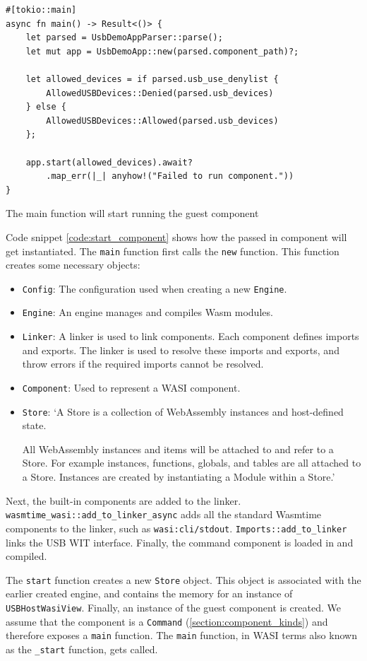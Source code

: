 \begin{code}
\begin{verbatim}
#[tokio::main]
async fn main() -> Result<()> {
	let parsed = UsbDemoAppParser::parse();
	let mut app = UsbDemoApp::new(parsed.component_path)?;

	let allowed_devices = if parsed.usb_use_denylist {
		AllowedUSBDevices::Denied(parsed.usb_devices)
	} else {
		AllowedUSBDevices::Allowed(parsed.usb_devices)
	};

	app.start(allowed_devices).await?
		.map_err(|_| anyhow!("Failed to run component."))
}
\end{verbatim}
\caption{The main function will start running the guest component}
\label{code:main}
\end{code}

Code snippet \ref{code:start_component} shows how the passed in component will get instantiated. The \texttt{main} function first calls the \texttt{new} function. This function creates some necessary objects: 
\begin{itemize}
\item \texttt{Config}: The configuration used when creating a new \texttt{Engine}.
\item \texttt{Engine}: An engine manages and compiles Wasm modules.
\item \texttt{Linker}: A linker is used to link components. Each component defines imports and exports. The linker is used to resolve these imports and exports, and throw errors if the required imports cannot be resolved.
\item \texttt{Component}: Used to represent a \acrshort{WASI} component.
\item \texttt{Store}: `A Store is a collection of WebAssembly instances and host-defined state.

All WebAssembly instances and items will be attached to and refer to a Store. For example instances, functions, globals, and tables are all attached to a Store. Instances are created by instantiating a Module within a Store.' \cite{wasmtime_store}
\end{itemize}

Next, the built-in components are added to the linker. \texttt{wasmtime\_wasi::add\_to\_linker\_async} adds all the standard Wasmtime components to the linker, such as \texttt{wasi:cli/stdout}. \texttt{Imports::add\_to\_linker} links the USB \acrshort{WIT} interface. Finally, the command component is loaded in and compiled.

The \texttt{start} function creates a new \texttt{Store} object. This object is associated with the earlier created engine, and contains the memory for an instance of \texttt{USBHostWasiView}. Finally, an instance of the guest component is created. We assume that the component is a \texttt{Command} (\ref{section:component_kinds}) and therefore exposes a \texttt{main} function. The \texttt{main} function, in \acrshort{WASI} terms also known as the \texttt{\_start} function, gets called.

